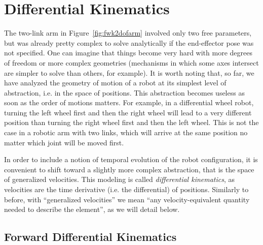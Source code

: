 \section{Differential Kinematics}\label{sec:kinematics:diff}

The two-link arm in Figure~\ref{fig:fwk2dofarm} involved only two free parameters, but was already pretty complex to solve analytically if the end-effector pose was not specified.
One can imagine that things become very hard with more degrees of freedom or more complex geometries (mechanisms in which some axes intersect are simpler to solve than others, for example).
It is worth noting that, so far, we have analyzed the geometry of motion of a robot at its simplest level of abstraction, i.e. in the space of positions. This abstraction becomes useless as soon as the order of motions matters. For example, in a differential wheel robot, turning the left wheel first and then the right wheel will lead to a very different position than turning the right wheel first and then the left wheel. This is not the case in a robotic arm with two links, which will arrive at the same position no matter which joint will be moved first. 

In order to include a notion of temporal evolution of the robot configuration, it is convenient to shift toward a slightly more complex abstraction, that is the space of generalized velocities. This modeling is called \textsl{differential kinematics}, as velocities are the time derivative (i.e. the differential) of positions.
Similarly to before, with ``generalized velocities'' we mean ``any velocity-equivalent quantity needed to describe the element'', as we will detail below.

\subsection{Forward Differential Kinematics}\label{sec:kinematics:diff:fwd}

